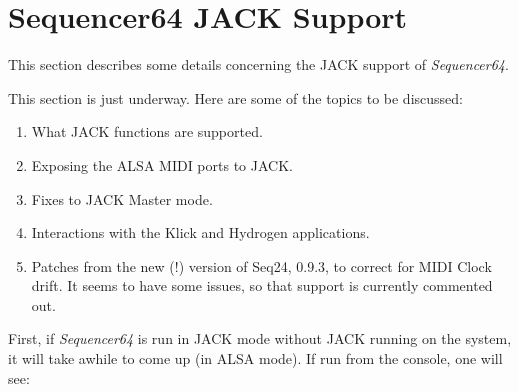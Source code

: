 %
%
%

\section{Sequencer64 JACK Support}
\label{sec:seq64_jack}

   This section describes some details concerning the JACK support of
   \textsl{Sequencer64}.

   This section is just underway.  Here are some of the topics to be discussed:

   \begin{enumerate}
      \item What JACK functions are supported.
      \item Exposing the ALSA MIDI ports to JACK.
      \item Fixes to JACK Master mode.
      \item Interactions with the Klick and Hydrogen applications.
      \item Patches from the new (!) version of Seq24, 0.9.3, to correct
         for MIDI Clock drift.  It seems to have some issues, so that support
         is currently commented out.
   \end{enumerate}

   First, if \textsl{Sequencer64} is run in JACK mode without JACK running on
   the system, it will take awhile to come up (in ALSA mode).  If run from the
   console, one will see:

